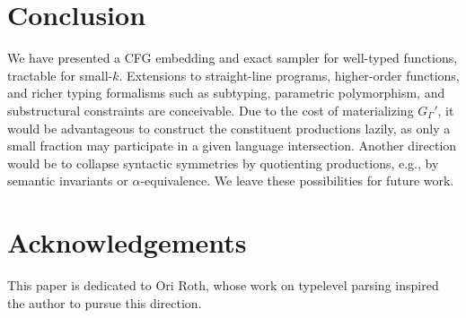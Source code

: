 \documentclass[sigplan,nonacm]{acmart}\settopmatter{printfolios=false,printccs=false,printacmref=false}
\begin{document}
  \section{Conclusion}

  We have presented a CFG embedding and exact sampler for well-typed functions, tractable for small-$k$. Extensions to straight-line programs, higher-order functions, and richer typing formalisms such as subtyping, parametric polymorphism, and substructural constraints are conceivable. Due to the cost of materializing $G_\Gamma'$, it would be advantageous to construct the constituent productions lazily, as only a small fraction may participate in a given language intersection. Another direction would be to collapse syntactic symmetries by quotienting productions, e.g., by semantic invariants or $\alpha$-equivalence. We leave these possibilities for future work.

  \clearpage
  \section{Acknowledgements}

  This paper is dedicated to Ori Roth, whose work on typelevel parsing inspired the author to pursue this direction.

  
  \appendix
\end{document}
